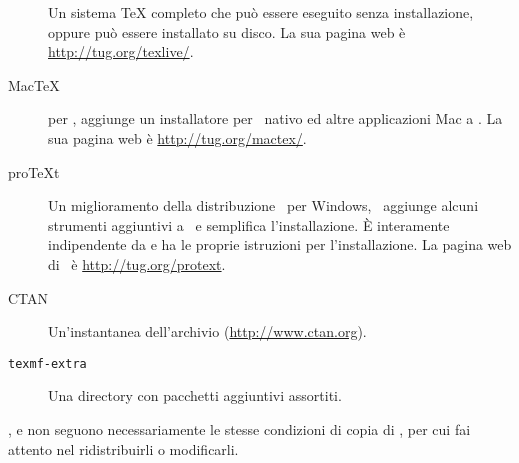 \documentclass{article}
\begin{document}
\begin{description}

\item [\TL] Un sistema \TeX{} completo che può essere eseguito senza
  installazione, oppure può essere installato su disco. La sua pagina web
  è \url{http://tug.org/texlive/}.

\item [Mac\TeX] per \MacOSX, aggiunge un installatore per \MacOSX\ nativo
  ed altre applicazioni Mac a \TL{}. La sua pagina web è
  \url{http://tug.org/mactex/}.

\item [pro\TeX{}t] Un miglioramento della distribuzione \MIKTEX\ per
  Windows, \ProTeXt\ aggiunge alcuni strumenti aggiuntivi a \MIKTEX\ e
  semplifica l'installazione. È interamente indipendente da \TL e ha le
  proprie istruzioni per l'installazione. La pagina web di \ProTeXt\ è
  \url{http://tug.org/protext}.  

\item [CTAN] Un'instantanea dell'archivio \CTAN{}
  (\url{http://www.ctan.org}).

\item [\texttt{texmf-extra}] Una directory con pacchetti aggiuntivi
  assortiti.

\end{description}

\CTAN{},  e  non seguono
necessariamente le stesse condizioni di copia di \TL{}, per cui fai
attento nel ridistribuirli o modificarli.
\end{document}
